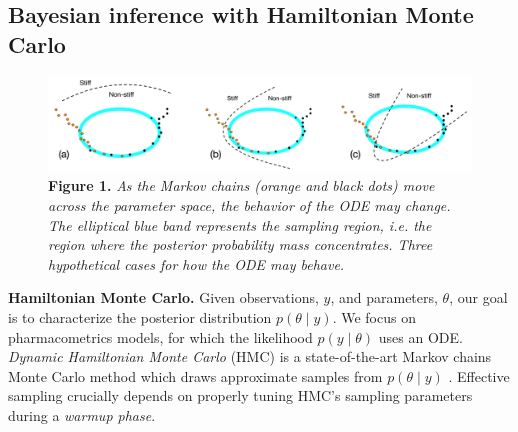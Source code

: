 \documentclass[21pt, custom, portrait, plainboxedsections]{sciposter}
\begin{document}
\begin{multicols}{3}
\raggedcolumns

\section*{Bayesian inference with Hamiltonian Monte Carlo}

\begin{figure}[H]
\includegraphics[width = 14in]{../figures/parameter_space_all}
\textbf{Figure 1.} \textit{As the Markov chains (orange and black dots) move across the parameter space, the behavior of the ODE may change. The elliptical blue band represents the sampling region, i.e. the region  where the posterior probability mass concentrates. Three hypothetical cases for how the ODE may behave.
}
\end{figure}

\textbf{Hamiltonian Monte Carlo.} Given observations, $y$, and parameters, $\theta$, our goal is to characterize the posterior distribution $p(\theta \mid y)$.
We focus on pharmacometrics models, for which the likelihood $p(y \mid \theta)$ uses an ODE.
\textit{Dynamic Hamiltonian Monte Carlo} (HMC) is a state-of-the-art Markov chains Monte Carlo method which draws approximate samples from $p(\theta \mid y)$ \cite{Betancourt:2018}.
Effective sampling crucially depends on properly tuning HMC's sampling parameters during a \textit{warmup phase}. \\




\end{multicols}
\end{document}
